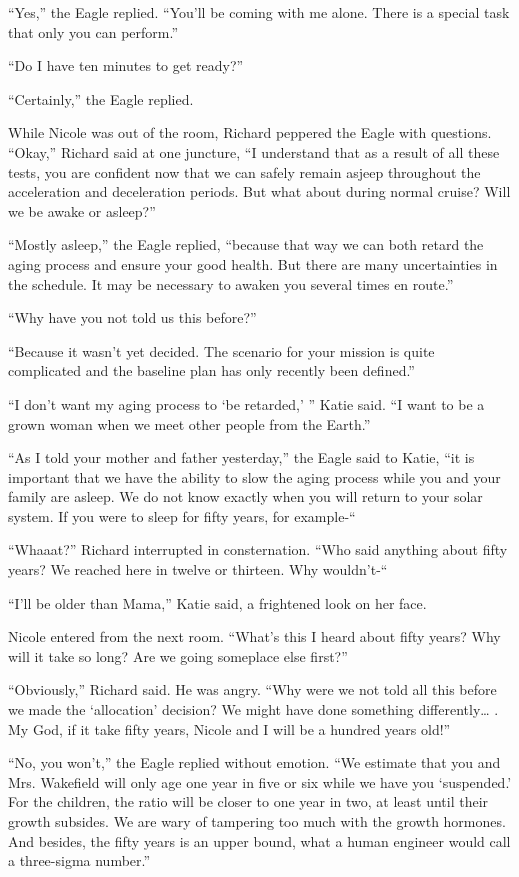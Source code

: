 \documentclass[]{article}
\begin{document}
{“Yes,” the Eagle replied.  “You’ll be coming with me alone.  There is a special task that only you can perform.”

“Do I have ten minutes to get ready?”

“Certainly,” the Eagle replied.

While Nicole was out of the room, Richard peppered the Eagle with questions.  “Okay,” Richard said at one juncture, “I understand that as a result of all these tests, you are confident now that we can safely remain asjeep throughout the acceleration and deceleration periods.  But what about during normal cruise? Will we be awake or asleep?”

“Mostly asleep,” the Eagle replied, “because that way we can both retard the aging process and ensure your good health.  But there are many uncertainties in the schedule.  It may be necessary to awaken you several times en route.”

“Why have you not told us this before?”

“Because it wasn’t yet decided.  The scenario for your mission is quite complicated and the baseline plan has only recently been defined.”

“I don’t want my aging process to ‘be retarded,’ ” Katie said.  “I want to be a grown woman when we meet other people from the Earth.”

“As I told your mother and father yesterday,” the Eagle said to Katie, “it is important that we have the ability to slow the aging process while you and your family are asleep.  We do not know exactly when you will return to your solar system.  If you were to sleep for fifty years, for example-“

“Whaaat?” Richard interrupted in consternation.  “Who said anything about fifty years? We reached here in twelve or thirteen.  Why wouldn’t-“

“I’ll be older than Mama,” Katie said, a frightened look on her face.

Nicole entered from the next room.  “What’s this I heard about fifty years? Why will it take so long? Are we going someplace else first?”

“Obviously,” Richard said.  He was angry.  “Why were we not told all this before we made the ‘allocation’ decision? We might have done something differently… .  My God, if it take fifty years, Nicole and I will be a hundred years old!”

“No, you won’t,” the Eagle replied without emotion.  “We estimate that you and Mrs.  Wakefield will only age one year in five or six while we have you ‘suspended.’ For the children, the ratio will be closer to one year in two, at least until their growth subsides.  We are wary of tampering too much with the growth hormones.  And besides, the fifty years is an upper bound, what a human engineer would call a three-sigma number.”

}
\end{document}
